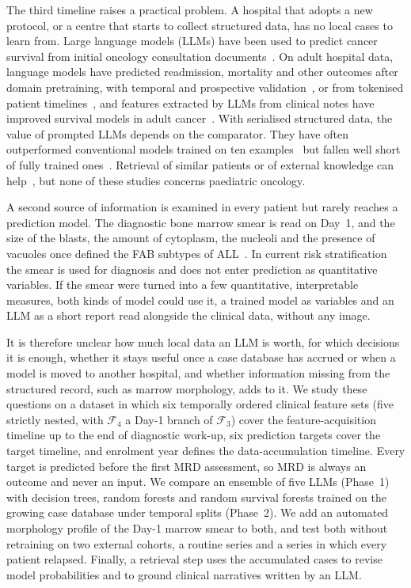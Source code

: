 \documentclass[pdflatex,sn-nature]{sn-jnl}
\begin{document}
The third timeline raises a practical problem.
A hospital that adopts a new protocol, or a centre that starts to
collect structured data, has no local cases to learn from.
Large language models (LLMs) have been used to predict cancer survival
from initial oncology consultation
documents~\cite{[CITE:Phaterpekar2026]}.
On adult hospital data, language models have predicted readmission,
mortality and other outcomes after domain pretraining, with temporal
and prospective validation~\cite{[CITE:Jiang2023NYUTron]}, or from
tokenised patient timelines~\cite{[CITE:Renc2024ETHOS]}, and features
extracted by LLMs from clinical notes have improved survival models in
adult cancer~\cite{[CITE:Kiermeyer2026]}.
With serialised structured data, the value of prompted LLMs depends on
the comparator.
They have often outperformed conventional models trained on ten
examples~\cite{[CITE:Zhu2026ClinicRealm]} but fallen well short of
fully trained ones~\cite{[CITE:ClinicalBench2026],[CITE:Brown2025JAMIA]}.
Retrieval of similar patients or of external knowledge can
help~\cite{[CITE:ChenPSB2026],[CITE:Datta2026],[CITE:Xu2024RAMEHR],[CITE:Zhu2024EMERGE],[CITE:Chen2025JMIR]},
but none of these studies concerns paediatric oncology.

A second source of information is examined in every patient but rarely
reaches a prediction model.
The diagnostic bone marrow smear is read on Day~1, and the size of the
blasts, the amount of cytoplasm, the nucleoli and the presence of
vacuoles once defined the FAB subtypes of ALL~\cite{[CITE:Bennett1976]}.
In current risk stratification the smear is used for diagnosis and
does not enter prediction as quantitative variables.
If the smear were turned into a few quantitative, interpretable
measures, both kinds of model could use it, a trained model as
variables and an LLM as a short report read alongside the clinical
data, without any image.

It is therefore unclear how much local data an LLM is worth, for which
decisions it is enough, whether it stays useful once a case database
has accrued or when a model is moved to another hospital, and whether
information missing from the structured record, such as marrow
morphology, adds to it.
We study these questions on a dataset in which six temporally ordered
clinical feature sets (five strictly nested, with $\mathcal{F}_4$ a
Day-1 branch of $\mathcal{F}_3$) cover the feature-acquisition timeline
up to the end of diagnostic work-up, six prediction targets cover the
target timeline, and enrolment year defines the data-accumulation
timeline.
Every target is predicted before the first MRD assessment, so MRD is
always an outcome and never an input.
We compare an ensemble of five LLMs (Phase~1) with decision trees,
random forests and random survival forests trained on the growing case
database under temporal splits (Phase~2).
We add an automated morphology profile of the Day-1 marrow smear to
both, and test both without retraining on two external cohorts, a
routine series and a series in which every patient relapsed.
Finally, a retrieval step uses the accumulated cases to revise model
probabilities and to ground clinical narratives written by an LLM.
\end{document}
